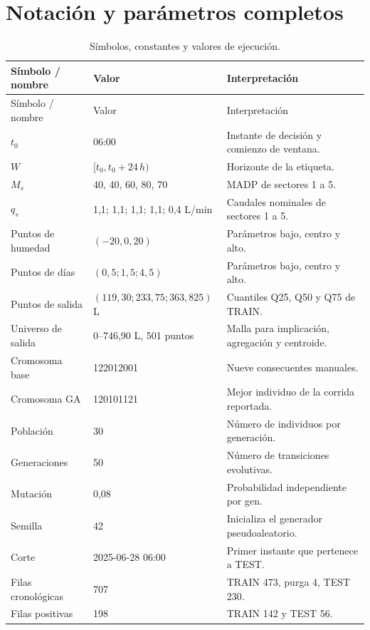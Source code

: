 \documentclass[11pt,letterpaper]{article}
\begin{document}
\appendix
\section{Notación y parámetros completos}
\begin{longtable}{p{3.2cm}p{4.5cm}p{6.8cm}}
\caption{Símbolos, constantes y valores de ejecución.}\label{tab:parametros}\\
\toprule
Símbolo / nombre & Valor & Interpretación\\
\midrule
\endfirsthead
\toprule Símbolo / nombre & Valor & Interpretación\\\midrule
\endhead
$t_0$ & 06:00 & Instante de decisión y comienzo de ventana.\\
$W$ & $[t_0,t_0+24\,h)$ & Horizonte de la etiqueta.\\
$M_s$ & 40, 40, 60, 80, 70 & MADP de sectores 1 a 5.\\
$q_s$ & 1,1; 1,1; 1,1; 1,1; 0,4 L/min & Caudales nominales de sectores 1 a 5.\\
Puntos de humedad & $(-20,0,20)$ & Parámetros bajo, centro y alto.\\
Puntos de días & $(0,5;1,5;4,5)$ & Parámetros bajo, centro y alto.\\
Puntos de salida & $(119,30;233,75;363,825)$ L & Cuantiles Q25, Q50 y Q75 de TRAIN.\\
Universo de salida & 0--746,90 L, 501 puntos & Malla para implicación, agregación y centroide.\\
Cromosoma base & 122012001 & Nueve consecuentes manuales.\\
Cromosoma GA & 120101121 & Mejor individuo de la corrida reportada.\\
Población & 30 & Número de individuos por generación.\\
Generaciones & 50 & Número de transiciones evolutivas.\\
Mutación & 0,08 & Probabilidad independiente por gen.\\
Semilla & 42 & Inicializa el generador pseudoaleatorio.\\
Corte & 2025-06-28 06:00 & Primer instante que pertenece a TEST.\\
Filas cronológicas & 707 & TRAIN 473, purga 4, TEST 230.\\
Filas positivas & 198 & TRAIN 142 y TEST 56.\\
\bottomrule
\end{longtable}
\end{document}
